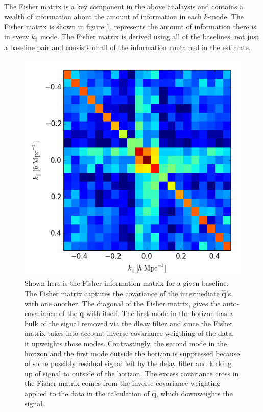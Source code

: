 \documentclass[twocolumn,numberedappendix]{emulateapj} \shorttitle{PSA64}
\newcommand{\qhat}{\hat{\mathbf{q}}}
\begin{document}
The Fisher matrix is a key component in the above analaysis and contains a
wealth of information about the amount of information in each $k$-mode. The
Fisher matrix is shown in figure \ref{fig:fisher}, represents the amount of
information there is in every $k_{\parallel}$ mode. The Fisher matrix is derived
using all of the baselines, not just a baseline pair and consists of all of the
information contained in the estimate.

\begin{figure}[b!]\centering
\includegraphics[width=\columnwidth, height=\columnwidth]{plots/fisher.png}
\caption{Shown here is the Fisher information matrix for a given baseline. The
Fisher matrix captures the covariance of the intermediate $\qhat$'s with one
another. The diagonal of the Fisher matrix, gives the auto-covariance of the
$\qhat$ with itself. The first mode in the horizon has a bulk of the signal
removed via the dleay filter and since the Fisher matrix takes into account
inverse covariance weigthing of the data, it upweights those modes.
Contrastingly, the second mode in the horizon and the first mode outside the
horizon is suppressed because of some possibly residual signal left by the delay
filter and kicking up of signal to outside of the horizon. The excess covariance
cross in the Fisher matrix comes from the inverse covariance weighting applied
to the data in the calculation of $\qhat$, which downweights the signal.}
\label{fig:fisher}
\end{figure}
\end{document}
